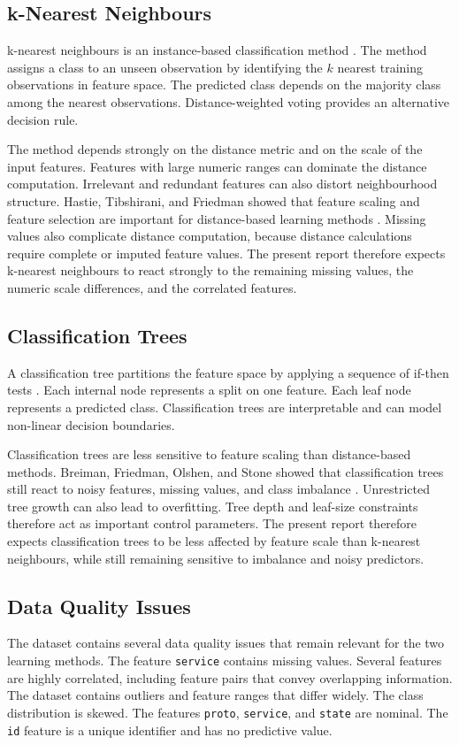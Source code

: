 \documentclass[conference,10pt]{IEEEtran}
\begin{document}
\subsection{k-Nearest Neighbours}
k-nearest neighbours is an instance-based classification method \cite{knn}. The method assigns a class to an unseen observation by identifying the $k$ nearest training observations in feature space. The predicted class depends on the majority class among the nearest observations. Distance-weighted voting provides an alternative decision rule.

The method depends strongly on the distance metric and on the scale of the input features. Features with large numeric ranges can dominate the distance computation. Irrelevant and redundant features can also distort neighbourhood structure. Hastie, Tibshirani, and Friedman showed that feature scaling and feature selection are important for distance-based learning methods \cite{htf}. Missing values also complicate distance computation, because distance calculations require complete or imputed feature values. The present report therefore expects k-nearest neighbours to react strongly to the remaining missing values, the numeric scale differences, and the correlated features.

\subsection{Classification Trees}
A classification tree partitions the feature space by applying a sequence of if-then tests \cite{tree}. Each internal node represents a split on one feature. Each leaf node represents a predicted class. Classification trees are interpretable and can model non-linear decision boundaries.

Classification trees are less sensitive to feature scaling than distance-based methods. Breiman, Friedman, Olshen, and Stone showed that classification trees still react to noisy features, missing values, and class imbalance \cite{cart}. Unrestricted tree growth can also lead to overfitting. Tree depth and leaf-size constraints therefore act as important control parameters. The present report therefore expects classification trees to be less affected by feature scale than k-nearest neighbours, while still remaining sensitive to imbalance and noisy predictors.

\subsection{Data Quality Issues}
The dataset contains several data quality issues that remain relevant for the two learning methods. The feature \texttt{service} contains missing values. Several features are highly correlated, including feature pairs that convey overlapping information. The dataset contains outliers and feature ranges that differ widely. The class distribution is skewed. The features \texttt{proto}, \texttt{service}, and \texttt{state} are nominal. The \texttt{id} feature is a unique identifier and has no predictive value.
\end{document}
